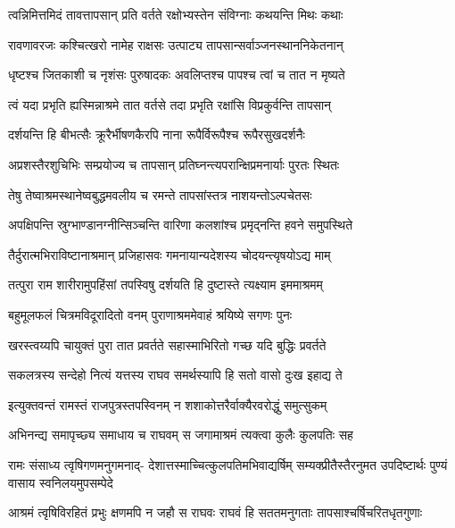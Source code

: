 \twolineshloka
{त्वन्निमित्तमिदं तावत्तापसान् प्रति वर्तते}
{रक्षोभ्यस्तेन संविग्नाः कथयन्ति मिथः कथाः} %

\twolineshloka
{रावणावरजः कश्चित्खरो नामेह राक्षसः}
{उत्पाट्य तापसान्सर्वाञ्जनस्थाननिकेतनान्} %

\twolineshloka
{धृष्टश्च जितकाशी च नृशंसः पुरुषादकः}
{अवलिप्तश्च पापश्च त्वां च तात न मृष्यते} %

\twolineshloka
{त्वं यदा प्रभृति ह्यस्मिन्नाश्रमे तात वर्तसे}
{तदा प्रभृति रक्षांसि विप्रकुर्वन्ति तापसान्} %

\twolineshloka
{दर्शयन्ति हि बीभत्सैः क्रूरैर्भीषणकैरपि}
{नाना रूपैर्विरूपैश्च रूपैरसुखदर्शनैः} %

\twolineshloka
{अप्रशस्तैरशुचिभिः सम्प्रयोज्य च तापसान्}
{प्रतिघ्नन्त्यपरान्क्षिप्रमनार्याः पुरतः स्थितः} %

\twolineshloka
{तेषु तेष्वाश्रमस्थानेष्वबुद्धमवलीय च}
{रमन्ते तापसांस्तत्र नाशयन्तोऽल्पचेतसः} %

\twolineshloka
{अपक्षिपन्ति स्रुग्भाण्डानग्नीन्सिञ्चन्ति वारिणा}
{कलशांश्च प्रमृद्नन्ति हवने समुपस्थिते} %

\twolineshloka
{तैर्दुरात्मभिराविष्टानाश्रमान् प्रजिहासवः}
{गमनायान्यदेशस्य चोदयन्त्यृषयोऽद्य माम्} %

\twolineshloka
{तत्पुरा राम शारीरामुपहिंसां तपस्विषु}
{दर्शयति हि दुष्टास्ते त्यक्ष्याम इममाश्रमम्} %

\twolineshloka
{बहुमूलफलं चित्रमविदूरादितो वनम्}
{पुराणाश्रममेवाहं श्रयिष्ये सगणः पुनः} %

\twolineshloka
{खरस्त्वय्यपि चायुक्तं पुरा तात प्रवर्तते}
{सहास्माभिरितो गच्छ यदि बुद्धिः प्रवर्तते} %

\twolineshloka
{सकलत्रस्य सन्देहो नित्यं यत्तस्य राघव}
{समर्थस्यापि हि सतो वासो दुःख इहाद्य ते} %

\twolineshloka
{इत्युक्तवन्तं रामस्तं राजपुत्रस्तपस्विनम्}
{न शशाकोत्तरैर्वाक्यैरवरोद्धुं समुत्सुकम्} %

\twolineshloka
{अभिनन्द्य समापृच्छ्य समाधाय च राघवम्}
{स जगामाश्रमं त्यक्त्वा कुलैः कुलपतिः सह} %

\fourlineindentedshloka
{रामः संसाध्य त्वृषिगणमनुगमनाद्-}
{देशात्तस्माच्चित्कुलपतिमभिवाद्यर्षिम्}
{सम्यक्प्रीतैस्तैरनुमत उपदिष्टार्थः}
{पुण्यं वासाय स्वनिलयमुपसम्पेदे} %

\fourlineindentedshloka
{आश्रमं त्वृषिविरहितं प्रभुः}
{क्षणमपि न जहौ स राघवः}
{राघवं हि सततमनुगताः}
{तापसाश्चर्षिचरितधृतगुणाः} %



